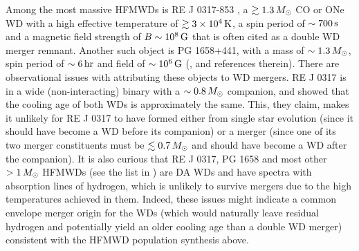 


Among the most massive HFMWDs is RE J 0317-853 \citep{bars+95, kube+10}, a $\gtrsim1.3\,\Msun$ CO or ONe WD with a high effective temperature of $\gtrsim3\times10^4\,\mathrm{K}$, a spin period of $\sim700\,\mathrm{s}$ and a magnetic field strength of $B\sim10^8\,\mathrm{G}$ that is often cited as a double WD merger remnant.  Another such object is PG 1658+441, with a mass of $\sim1.3\,\Msun$, spin period of $\sim6\,\mathrm{hr}$ and field of $\sim10^6\,\mathrm{G}$ (\citealt{ferrdg15}, and references therein).  There are observational issues with attributing these objects to WD mergers.  RE J 0317 is in a wide (non-interacting) binary with a $\sim0.8\,\Msun$ companion, and \cite{kube+10} showed that the cooling age of both WDs is approximately the same.  This, they claim, makes it unlikely for RE J 0317 to have formed either from single star evolution (since it should have become a WD before its companion) or a merger (since one of its two merger constituents must be $\lesssim0.7\,\Msun$ and should have become a WD after the companion).  It is also curious that RE J 0317, PG 1658 and most other $>1\,\Msun$ HFMWDs (see the list in \citealt{ferrdg15}) are DA WDs and have spectra with absorption lines of hydrogen, which is unlikely to survive mergers due to the high temperatures achieved in them.  Indeed, these issues might indicate a common envelope merger origin for the WDs (which would naturally leave residual hydrogen and potentially yield an older cooling age than a double WD merger) consistent with the HFMWD population synthesis above.


